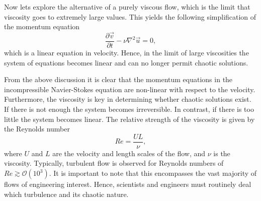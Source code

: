 Now lets explore the alternative of a purely viscous flow, which is the limit that viscosity goes to extremely large values. This yields the following simplification of the momentum equation
\begin{equation}
	\frac{\partial \vec{v}}{\partial t} - \nu \nabla^2 \vec{u} = 0,
\end{equation}
which is a linear equation in velocity. Hence, in the limit of large viscosities the system of equations becomes linear and can no longer permit chaotic solutions.

From the above discussion it is clear that the momentum equations in the incompressible Navier-Stokes equation are non-linear with respect to the velocity. Furthermore, the viscosity is key in determining whether chaotic solutions exist. If there is not enough the system becomes irreversible. In contrast, if there is too little the system becomes linear. The relative strength of the viscosity is given by the Reynolds number
\begin{equation}
	Re = \frac{UL}{\nu},
\end{equation}
where $U$ and $L$ are the velocity and length scales of the flow, and $\nu$ is the viscosity. Typically, turbulent flow is observed for Reynolds numbers of $Re \gtrsim \mathcal{O}(10^3)$. It is important to note that this encompasses the vast majority of flows of engineering interest. Hence, scientists and engineers must routinely deal which turbulence and its chaotic nature.

